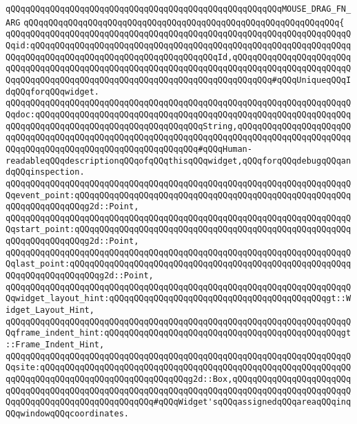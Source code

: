 \verb|qQQqqQQqqQQqqQQqqQQqqQQqqQQqqQQqqQQqqQQqqQQqqQQqqQQqqQQqMOUSE_DRAG_FN_ARG|\newline
\verb|qQQqqQQqqQQqqQQqqQQqqQQqqQQqqQQqqQQqqQQqqQQqqQQqqQQqqQQqqQQqqQQq{|\newline
\verb|qQQqqQQqqQQqqQQqqQQqqQQqqQQqqQQqqQQqqQQqqQQqqQQqqQQqqQQqqQQqqQQqqQQqqQQqid:qQQqqQQqqQQqqQQqqQQqqQQqqQQqqQQqqQQqqQQqqQQqqQQqqQQqqQQqqQQqqQQqqQQqqQQqqQQqqQQqqQQqqQQqqQQqqQQqqQQqqQQqqQQqId,qQQqqQQqqQQqqQQqqQQqqQQqqQQqqQQqqQQqqQQqqQQqqQQqqQQqqQQqqQQqqQQqqQQqqQQqqQQqqQQqqQQqqQQqqQQqqQQqqQQqqQQqqQQqqQQqqQQqqQQqqQQqqQQqqQQqqQQqqQQqqQQqqQQq#qQQqUniqueqQQqIdqQQqforqQQqwidget.|\newline
\verb|qQQqqQQqqQQqqQQqqQQqqQQqqQQqqQQqqQQqqQQqqQQqqQQqqQQqqQQqqQQqqQQqqQQqqQQqdoc:qQQqqQQqqQQqqQQqqQQqqQQqqQQqqQQqqQQqqQQqqQQqqQQqqQQqqQQqqQQqqQQqqQQqqQQqqQQqqQQqqQQqqQQqqQQqqQQqqQQqqQQqString,qQQqqQQqqQQqqQQqqQQqqQQqqQQqqQQqqQQqqQQqqQQqqQQqqQQqqQQqqQQqqQQqqQQqqQQqqQQqqQQqqQQqqQQqqQQqqQQqqQQqqQQqqQQqqQQqqQQqqQQqqQQqqQQqqQQq#qQQqHuman-readableqQQqdescriptionqQQqofqQQqthisqQQqwidget,qQQqforqQQqdebugqQQqandqQQqinspection.|\newline
\verb|qQQqqQQqqQQqqQQqqQQqqQQqqQQqqQQqqQQqqQQqqQQqqQQqqQQqqQQqqQQqqQQqqQQqqQQqevent_point:qQQqqQQqqQQqqQQqqQQqqQQqqQQqqQQqqQQqqQQqqQQqqQQqqQQqqQQqqQQqqQQqqQQqqQQqg2d::Point,|\newline
\verb|qQQqqQQqqQQqqQQqqQQqqQQqqQQqqQQqqQQqqQQqqQQqqQQqqQQqqQQqqQQqqQQqqQQqqQQqstart_point:qQQqqQQqqQQqqQQqqQQqqQQqqQQqqQQqqQQqqQQqqQQqqQQqqQQqqQQqqQQqqQQqqQQqqQQqg2d::Point,|\newline
\verb|qQQqqQQqqQQqqQQqqQQqqQQqqQQqqQQqqQQqqQQqqQQqqQQqqQQqqQQqqQQqqQQqqQQqqQQqlast_point:qQQqqQQqqQQqqQQqqQQqqQQqqQQqqQQqqQQqqQQqqQQqqQQqqQQqqQQqqQQqqQQqqQQqqQQqqQQqg2d::Point,|\newline
\verb|qQQqqQQqqQQqqQQqqQQqqQQqqQQqqQQqqQQqqQQqqQQqqQQqqQQqqQQqqQQqqQQqqQQqqQQqwidget_layout_hint:qQQqqQQqqQQqqQQqqQQqqQQqqQQqqQQqqQQqqQQqqQQqgt::Widget_Layout_Hint,|\newline
\verb|qQQqqQQqqQQqqQQqqQQqqQQqqQQqqQQqqQQqqQQqqQQqqQQqqQQqqQQqqQQqqQQqqQQqqQQqframe_indent_hint:qQQqqQQqqQQqqQQqqQQqqQQqqQQqqQQqqQQqqQQqqQQqqQQqgt::Frame_Indent_Hint,|\newline
\verb|qQQqqQQqqQQqqQQqqQQqqQQqqQQqqQQqqQQqqQQqqQQqqQQqqQQqqQQqqQQqqQQqqQQqqQQqsite:qQQqqQQqqQQqqQQqqQQqqQQqqQQqqQQqqQQqqQQqqQQqqQQqqQQqqQQqqQQqqQQqqQQqqQQqqQQqqQQqqQQqqQQqqQQqqQQqqQQqg2d::Box,qQQqqQQqqQQqqQQqqQQqqQQqqQQqqQQqqQQqqQQqqQQqqQQqqQQqqQQqqQQqqQQqqQQqqQQqqQQqqQQqqQQqqQQqqQQqqQQqqQQqqQQqqQQqqQQqqQQqqQQqqQQq#qQQqWidget'sqQQqassignedqQQqareaqQQqinqQQqwindowqQQqcoordinates.|\newline
